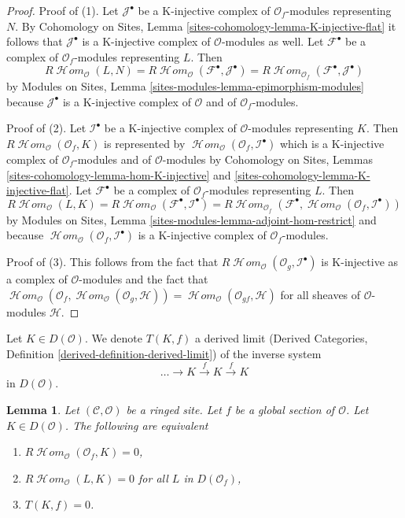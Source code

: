 \documentclass{stacks-project}
\theoremstyle{plain}
\newtheorem{lemma}[subsection]{Lemma}
\theoremstyle{definition}
\theoremstyle{remark}
\numberwithin{equation}{subsection}
\def\SheafHom{\mathop{\mathcal{H}\!\mathit{om}}\nolimits}
\begin{document}
\begin{proof}
Proof of (1). Let $\mathcal{J}^\bullet$ be a K-injective complex of
$\mathcal{O}_f$-modules representing $N$. By Cohomology on Sites, Lemma
\ref{sites-cohomology-lemma-K-injective-flat} it follows that
$\mathcal{J}^\bullet$ is a K-injective complex of
$\mathcal{O}$-modules as well. Let $\mathcal{F}^\bullet$ be a complex of
$\mathcal{O}_f$-modules representing $L$. Then
$$
R\SheafHom_\mathcal{O}(L, N) =
R\SheafHom_\mathcal{O}(\mathcal{F}^\bullet, \mathcal{J}^\bullet) =
R\SheafHom_{\mathcal{O}_f}(\mathcal{F}^\bullet, \mathcal{J}^\bullet)
$$
by
Modules on Sites, Lemma \ref{sites-modules-lemma-epimorphism-modules}
because $\mathcal{J}^\bullet$ is a K-injective complex of $\mathcal{O}$
and of $\mathcal{O}_f$-modules.

\medskip\noindent
Proof of (2). Let $\mathcal{I}^\bullet$ be a K-injective complex of
$\mathcal{O}$-modules representing $K$.
Then $R\SheafHom_\mathcal{O}(\mathcal{O}_f, K)$ is represented by
$\SheafHom_\mathcal{O}(\mathcal{O}_f, \mathcal{I}^\bullet)$ which is
a K-injective complex of $\mathcal{O}_f$-modules and of
$\mathcal{O}$-modules by
Cohomology on Sites, Lemmas \ref{sites-cohomology-lemma-hom-K-injective} and
\ref{sites-cohomology-lemma-K-injective-flat}.
Let $\mathcal{F}^\bullet$ be a complex of $\mathcal{O}_f$-modules
representing $L$. Then
$$
R\SheafHom_\mathcal{O}(L, K) =
R\SheafHom_\mathcal{O}(\mathcal{F}^\bullet, \mathcal{I}^\bullet) =
R\SheafHom_{\mathcal{O}_f}(\mathcal{F}^\bullet,
\SheafHom_\mathcal{O}(\mathcal{O}_f, \mathcal{I}^\bullet))
$$
by Modules on Sites, Lemma \ref{sites-modules-lemma-adjoint-hom-restrict}
and because $\SheafHom_\mathcal{O}(\mathcal{O}_f, \mathcal{I}^\bullet)$ is a
K-injective complex of $\mathcal{O}_f$-modules.

\medskip\noindent
Proof of (3). This follows from the fact that
$R\SheafHom_\mathcal{O}(\mathcal{O}_g, \mathcal{I}^\bullet)$
is K-injective as a complex of $\mathcal{O}$-modules and the fact that
$\SheafHom_\mathcal{O}(\mathcal{O}_f,
\SheafHom_\mathcal{O}(\mathcal{O}_g, \mathcal{H})) = 
\SheafHom_\mathcal{O}(\mathcal{O}_{gf}, \mathcal{H})$
for all sheaves of $\mathcal{O}$-modules $\mathcal{H}$.
\end{proof}

\noindent
Let $K \in D(\mathcal{O})$. We denote
$T(K, f)$ a derived limit (Derived Categories, Definition
\ref{derived-definition-derived-limit}) of the inverse system
$$
\ldots \to K \xrightarrow{f} K \xrightarrow{f} K
$$
in $D(\mathcal{O})$.

\begin{lemma}
\label{lemma-hom-from-Af}
Let $(\mathcal{C}, \mathcal{O})$ be a ringed site. Let $f$ be a global
section of $\mathcal{O}$. Let $K \in D(\mathcal{O})$.
The following are equivalent
\begin{enumerate}
\item $R\SheafHom_\mathcal{O}(\mathcal{O}_f, K) = 0$,
\item $R\SheafHom_\mathcal{O}(L, K) = 0$ for all $L$ in $D(\mathcal{O}_f)$,
\item $T(K, f) = 0$.
\end{enumerate}
\end{lemma}
\end{document}
